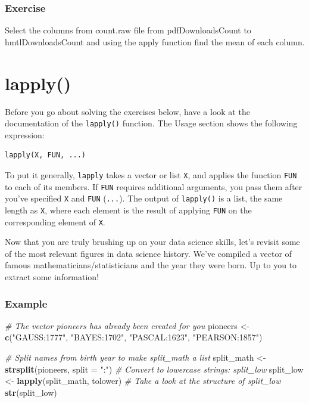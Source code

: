 \documentclass[
]{book}
\newenvironment{Shaded}{\begin{snugshade}}{\end{snugshade}}
\newcommand{\CommentTok}[1]{\textcolor[rgb]{0.56,0.35,0.01}{\textit{#1}}}
\newcommand{\DataTypeTok}[1]{\textcolor[rgb]{0.13,0.29,0.53}{#1}}
\newcommand{\KeywordTok}[1]{\textcolor[rgb]{0.13,0.29,0.53}{\textbf{#1}}}
\newcommand{\NormalTok}[1]{#1}
\newcommand{\StringTok}[1]{\textcolor[rgb]{0.31,0.60,0.02}{#1}}
\begin{document}
\hypertarget{exercise-3}{%
\subsubsection*{Exercise}\label{exercise-3}}

Select the columns from count.raw file from pdfDownloadsCount to hmtlDownloadsCount and using the apply function find the mean of each column.

\hypertarget{lapply}{%
\section{lapply()}\label{lapply}}

Before you go about solving the exercises below, have a look at the documentation of the \texttt{lapply()} function. The Usage section shows the following expression:

\begin{verbatim}
lapply(X, FUN, ...)
\end{verbatim}

To put it generally, \texttt{lapply} takes a vector or list \texttt{X}, and applies the function \texttt{FUN} to each of its members. If \texttt{FUN} requires additional arguments, you pass them after you've specified \texttt{X} and \texttt{FUN} (\texttt{...}). The output of \texttt{lapply()} is a list, the same length as \texttt{X}, where each element is the result of applying \texttt{FUN} on the corresponding element of \texttt{X}.

Now that you are truly brushing up on your data science skills, let's revisit some of the most relevant figures in data science history. We've compiled a vector of famous mathematicians/statisticians and the year they were born. Up to you to extract some information!

\hypertarget{example}{%
\subsubsection{Example}\label{example}}

\begin{Shaded}
\begin{Highlighting}[]
\CommentTok{# The vector pioneers has already been created for you}
\NormalTok{pioneers <-}\StringTok{ }\KeywordTok{c}\NormalTok{(}\StringTok{"GAUSS:1777"}\NormalTok{, }\StringTok{"BAYES:1702"}\NormalTok{, }\StringTok{"PASCAL:1623"}\NormalTok{, }\StringTok{"PEARSON:1857"}\NormalTok{)}

\CommentTok{# Split names from birth year to make split_math a list}
\NormalTok{split_math <-}\StringTok{ }\KeywordTok{strsplit}\NormalTok{(pioneers, }\DataTypeTok{split =} \StringTok{":"}\NormalTok{)}
\CommentTok{# Convert to lowercase strings: split_low}
\NormalTok{split_low <-}\StringTok{ }\KeywordTok{lapply}\NormalTok{(split_math, tolower)}
\CommentTok{# Take a look at the structure of split_low}
\KeywordTok{str}\NormalTok{(split_low)}
\end{Highlighting}
\end{Shaded}
\end{document}
